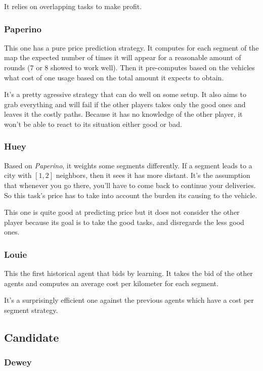 \documentclass[11pt,a4paper]{article}
\begin{document}
It relies on overlapping tasks to make profit.

\subsubsection*{Paperino}

This one has a pure price prediction strategy. It computes for each segment of
the map the expected number of times it will appear for a reasonable amount
of rounds ($7$ or $8$ showed to work well). Then it pre-computes based on the
vehicles what cost of one usage based on the total amount it expects to obtain.

It's a pretty agressive strategy that can do well on some setup. It also aims
to grab everything and will fail if the other players takes only the good ones
and leaves it the costly paths. Because it has no knowledge of the other player,
it won't be able to react to its situation either good or bad.

\subsubsection*{Huey}

Based on \emph{Paperino}, it weights some segments differently. If a segment
leads to a city with $[1,2]$ neighbors, then it sees it has more distant. It's
the assumption that whenever you go there, you'll have to come back to continue
your deliveries. So this task's price has to take into account the burden its
causing to the vehicle.

This one is quite good at predicting price but it does not consider the other
player because its goal is to take the good tasks, and disregards the less good
ones.

\subsubsection*{Louie}

This the first historical agent that bids by learning. It takes the bid of the
other agents and computes an average cost per kilometer for each segment.

It's a surprisingly efficient one against the previous agents which have a
cost per segment strategy.

\subsection*{Candidate}
\subsubsection*{Dewey}
\end{document}

